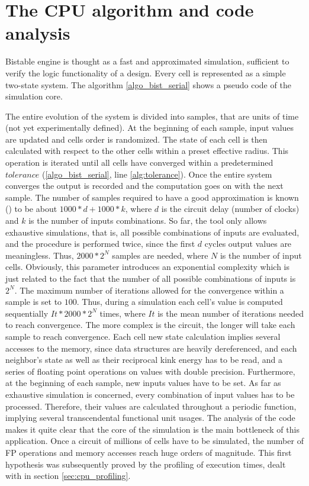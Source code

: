 \section{The CPU algorithm and code analysis}\label{sec:cpu_algorithm}
Bistable engine is thought as a fast and approximated simulation, sufficient to verify the logic functionality of a design. 
Every cell is represented as a simple two-state system. The algorithm \ref{algo_bist_serial} shows a pseudo code of the simulation core. 

The entire evolution of the system is divided into samples, that are units of time (not yet experimentally defined). At the beginning of each sample, input values are updated and cells order is randomized. The state of each cell is then calculated with respect to the other cells within 
a preset effective radius. This operation is iterated until all cells have converged within a predetermined $tolerance$ (\ref{algo_bist_serial}, line \ref{alg:tolerance}). 
Once the entire system converges the output is recorded and the computation goes on with the next sample.
The number of samples required to have a good approximation is known (\cite{site:MinaBistable}) to be about $1000*d+1000*k$, where $d$ is the circuit delay (number of clocks) and $k$ is the number of inputs combinations. So far, the tool only allows exhaustive simulations, that is, all possible combinations of inputs are evaluated, and the procedure is performed twice, since the first $d$ cycles output values are meaningless. Thus, $2000*2^N$ samples are needed, where $N$ is the number of input cells. Obviously, this parameter introduces an exponential complexity which is just related to the fact that the number of all possible combinations of inputs is $2^N$.
 The maximum number of iterations allowed for the convergence within a sample is set to $100$. Thus, during a simulation each cell's value 
is computed sequentially $It*2000*2^N$ times, where $It$ is the mean number of iterations needed to reach convergence. 
The more complex is the circuit, the longer will take each sample to reach convergence. Each cell new state calculation implies several accesses to the memory, since data structures are heavily dereferenced, and each neighbor's state as well as their reciprocal kink energy has to be read, and a series of floating point operations on values with double precision. Furthermore, at the beginning of each sample, new inputs values have to be set. As far as exhaustive simulation is concerned, every combination of input values has to be processed. Therefore, their values are calculated throughout a periodic function, implying several transcendental functional unit usages.\newline
The analysis of the code makes it quite clear that the core of the simulation is the main bottleneck of this application. Once a circuit of millions of cells have to be simulated, the number of FP operations and memory accesses reach huge orders of magnitude. This first hypothesis was subsequently proved by the profiling of execution times, dealt with in section \ref{sec:cpu_profiling}.



